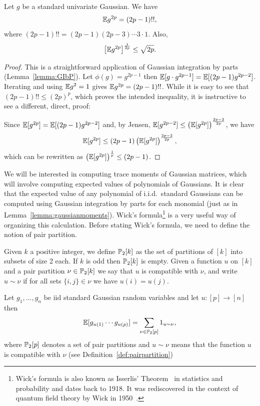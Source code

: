 \begin{lemma}\label{lemma:gaussianmoments}
Let $g$ be a standard univariate Gaussian. We have
\[
\mathbb{E} g^{2p} = (2p-1)!!,
\]
where $(2p-1)!! = (2p-1)(2p-3)\cdots3\cdot1$.
Also, 
\[
\left[\mathbb{E} g^{2p}\right]^{\frac1{2p}} \leq \sqrt{2p}.
\]
\end{lemma}

\begin{proof} This is a straightforward application of Gaussian integration by parts (Lemma~\ref{lemma:GIbP}). Let $\phi(g)=g^{2p-1}$ then $\mathbb{E}[g\cdot g^{2p-1}] = \mathbb{E}[(2p-1) g^{2p-2}]$. Iterating and using $\mathbb{E} g^2=1$ gives $\mathbb{E} g^{2p} = (2p-1)!!$. While it is easy to see that $(2p-1)!!\leq (2p)^{p}$, which proves the intended inequality, it is instructive to see a different, direct, proof:

Since $\mathbb{E}[g^{2p}] = \mathbb{E}[(2p-1) g^{2p-2}]$ and, by Jensen, $\mathbb{E}[g^{2p-2}]\leq \left(\mathbb{E}[g^{2p}]\right)^{\frac{2p-2}{2p}}$, we have 
\[
\mathbb{E}[g^{2p}] \leq (2p-1) \left(\mathbb{E}[g^{2p}]\right)^{\frac{2p-2}{2p}},
\]
which can be rewritten as $\left(\mathbb{E}[g^{2p}]\right)^{\frac{1}{p}}\leq (2p-1)$.
\end{proof}

We will be interested in computing trace moments of Gaussian matrices, which will involve computing expected values of polynomials of Gaussians. It is clear that the expected value of any polynomial of i.i.d.\ standard Gaussians can be computed using Gaussian integration by parts for each monomial (just as in Lemma~\ref{lemma:gaussianmoments}). Wick's formula\footnote{Wick's formula is also known as Isserlis' Theorem~\cite{isserlis1918formula} in statistics and probability and dates back to 1918. It was rediscovered in the context of quantum field theory by Wick in 1950~\cite{wick1950evaluation}.} is a very useful way of organizing this calculation. Before stating Wick's formula, we need to define the notion of pair partition.

\begin{definition}\label{def:pairpartition}
Given $k$ a positive integer, we define $\mathbb{P}_2[k]$ as the set of partitions of $[k]$ into subsets of size 2 each. If $k$ is odd then $\mathbb{P}_2[k]$ is empty. Given a function $u$ on $[k]$ and a pair partition $\nu\in\mathbb{P}_2[k]$ we say that $u$ is compatible with $\nu$, and write $u\sim\nu$ if for all sets $\{i,j\}\in\nu$ we have $u(i)=u(j)$.
\end{definition}


\begin{lemma}\label{lemma:Wicksformula}
Let $g_1,\dots,g_n$ be iid standard Gaussian random variables and let $u:[p]\to[n]$ then
\[
\mathbb{E}[g_{u(1)}\cdots g_{u(p)}] = \sum_{\nu\in \mathbb{P}_2[p]} 1_{u \sim \nu},
\]
where $\mathbb{P}_2[p]$ denotes a set of pair partitions and $u \sim \nu$ means that the function $u$ is compatible with $\nu$ (see Definition~\ref{def:pairpartition})
\end{lemma}

